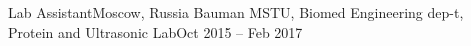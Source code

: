 \resumeSubheading
    {Lab Assistant}{Moscow, Russia}
    {Bauman MSTU, Biomed Engineering dep-t, Protein and Ultrasonic Lab}{Oct 2015 -- Feb 2017}